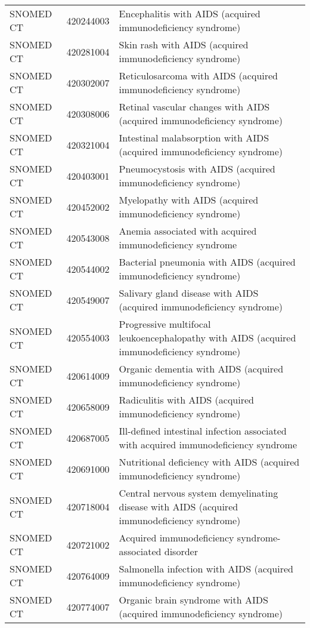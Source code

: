 \begin{longtable}{p{}p{}p{}}
  SNOMED CT & 420244003 & Encephalitis with AIDS (acquired immunodeficiency syndrome) \\ 
  SNOMED CT & 420281004 & Skin rash with AIDS (acquired immunodeficiency syndrome) \\ 
  SNOMED CT & 420302007 & Reticulosarcoma with AIDS (acquired immunodeficiency syndrome) \\ 
  SNOMED CT & 420308006 & Retinal vascular changes with AIDS (acquired immunodeficiency syndrome) \\ 
  SNOMED CT & 420321004 & Intestinal malabsorption with AIDS (acquired immunodeficiency syndrome) \\ 
  SNOMED CT & 420403001 & Pneumocystosis with AIDS (acquired immunodeficiency syndrome) \\ 
  SNOMED CT & 420452002 & Myelopathy with AIDS (acquired immunodeficiency syndrome) \\ 
  SNOMED CT & 420543008 & Anemia associated with acquired immunodeficiency syndrome \\ 
  SNOMED CT & 420544002 & Bacterial pneumonia with AIDS (acquired immunodeficiency syndrome) \\ 
  SNOMED CT & 420549007 & Salivary gland disease with AIDS (acquired immunodeficiency syndrome) \\ 
  SNOMED CT & 420554003 & Progressive multifocal leukoencephalopathy with AIDS (acquired immunodeficiency syndrome) \\ 
  SNOMED CT & 420614009 & Organic dementia with AIDS (acquired immunodeficiency syndrome) \\ 
  SNOMED CT & 420658009 & Radiculitis with AIDS (acquired immunodeficiency syndrome) \\ 
  SNOMED CT & 420687005 & Ill-defined intestinal infection associated with acquired immunodeficiency syndrome \\ 
  SNOMED CT & 420691000 & Nutritional deficiency with AIDS (acquired immunodeficiency syndrome) \\ 
  SNOMED CT & 420718004 & Central nervous system demyelinating disease with AIDS (acquired immunodeficiency syndrome) \\ 
  SNOMED CT & 420721002 & Acquired immunodeficiency syndrome-associated disorder \\ 
  SNOMED CT & 420764009 & Salmonella infection with AIDS (acquired immunodeficiency syndrome) \\ 
  SNOMED CT & 420774007 & Organic brain syndrome with AIDS (acquired immunodeficiency syndrome) \\ 

\end{longtable}
